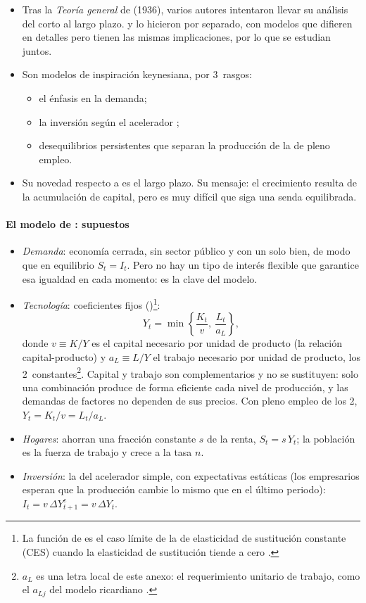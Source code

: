 \documentclass[11pt]{article}
\begin{document}
\begin{itemize}
\item Tras la \emph{Teoría general} de  (1936), varios autores intentaron llevar su análisis del corto al largo plazo. \textcite{Harrod1939} y \textcite{Domar1946} lo hicieron por separado, con modelos que difieren en detalles pero tienen las mismas implicaciones, por lo que se estudian juntos.
\item Son modelos de inspiración keynesiana, por 3~rasgos:
  \begin{itemize}
  \item el énfasis en la demanda;
  \item la inversión según el acelerador ;
  \item desequilibrios persistentes que separan la producción de la de pleno empleo.
  \end{itemize}
\item Su novedad respecto a  es el largo plazo. Su mensaje: el crecimiento resulta de la acumulación de capital, pero es muy difícil que siga una senda equilibrada.
\end{itemize}

\paragraph{El modelo de : supuestos}

\begin{itemize}
\item \emph{Demanda}: economía cerrada, sin sector público y con un solo bien, de modo que en equilibrio $S_t=I_t$. Pero no hay un tipo de interés flexible que garantice esa igualdad en cada momento: es la clave del modelo.
\item \emph{Tecnología}: coeficientes fijos ()\footnote{La función de  es el caso límite de la de elasticidad de sustitución constante (CES) cuando la elasticidad de sustitución tiende a cero .}:
  \[Y_t=\min\left\{\frac{K_t}{v},\ \frac{L_t}{a_L}\right\},\]
  donde $v\equiv K/Y$ es el capital necesario por unidad de producto (la relación capital-producto) y $a_L\equiv L/Y$ el trabajo necesario por unidad de producto, los 2~constantes\footnote{$a_L$ es una letra local de este anexo: el requerimiento unitario de trabajo, como el $a_{Lj}$ del modelo ricardiano .}. Capital y trabajo son complementarios y no se sustituyen: solo una combinación produce de forma eficiente cada nivel de producción, y las demandas de factores no dependen de sus precios. Con pleno empleo de los 2, $Y_t=K_t/v=L_t/a_L$.
\item \emph{Hogares}: ahorran una fracción constante $s$ de la renta, $S_t=s\,Y_t$; la población es la fuerza de trabajo y crece a la tasa $n$.
\item \emph{Inversión}: la del acelerador simple, con expectativas estáticas (los empresarios esperan que la producción cambie lo mismo que en el último periodo): $I_t=v\,\Delta Y^e_{t+1}=v\,\Delta Y_t$.
\end{itemize}
\end{document}
